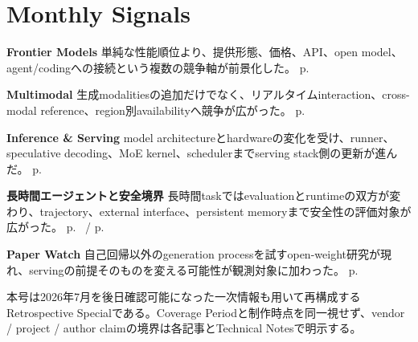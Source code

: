 \section*{Monthly Signals}
\smallskip
\noindent\textbf{Frontier Models} 単純な性能順位より、提供形態、価格、API、open model、agent/codingへの接続という複数の競争軸が前景化した。 \hfill{\footnotesize p.~\pageref{pkg:frontier-models-july}}\par
\smallskip
\noindent\textbf{Multimodal} 生成modalitiesの追加だけでなく、リアルタイムinteraction、cross-modal reference、region別availabilityへ競争が広がった。 \hfill{\footnotesize p.~\pageref{pkg:multimodal-july}}\par
\smallskip
\noindent\textbf{Inference \& Serving} model architectureとhardwareの変化を受け、runner、speculative decoding、MoE kernel、schedulerまでserving stack側の更新が進んだ。 \hfill{\footnotesize p.~\pageref{pkg:inference-serving-july}}\par
\smallskip
\noindent\textbf{長時間エージェントと安全境界} 長時間taskではevaluationとruntimeの双方が変わり、trajectory、external interface、persistent memoryまで安全性の評価対象が広がった。 \hfill{\footnotesize p.~\pageref{pkg:agents-july} / p.~\pageref{pkg:agent-safety-security-july}}\par
\smallskip
\noindent\textbf{Paper Watch} 自己回帰以外のgeneration processを試すopen-weight研究が現れ、servingの前提そのものを変える可能性が観測対象に加わった。 \hfill{\footnotesize p.~\pageref{pkg:paper-watch-july}}\par
\medskip
\begin{claimboundary}
本号は2026年7月を後日確認可能になった一次情報も用いて再構成するRetrospective Specialである。Coverage Periodと制作時点を同一視せず、vendor / project / author claimの境界は各記事とTechnical Notesで明示する。
\end{claimboundary}
\medskip
\tableofcontents

